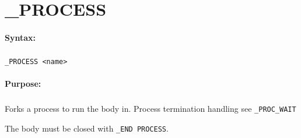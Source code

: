 
\newpage
\section{\_PROCESS}
\label{cmd:_PROCESS}

\paragraph{Syntax:}
\subparagraph{}
\texttt{\_PROCESS <name>}

\paragraph{Purpose:}
\subparagraph{}
Forks a process to run the body in. Process termination handling see \texttt{\_PROC\_WAIT}

The body must be closed with \texttt{\_END PROCESS}.
